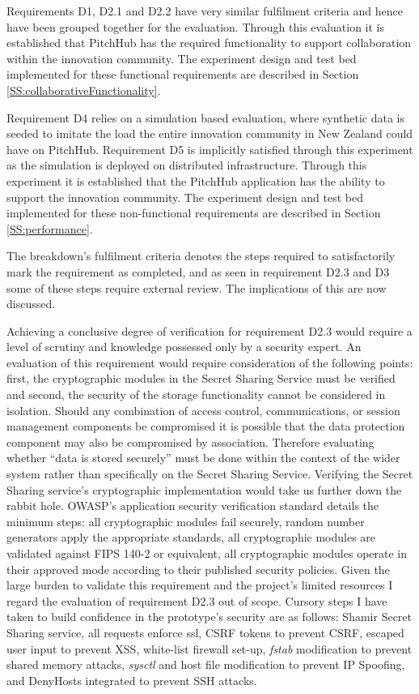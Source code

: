 Requirements D1, D2.1 and D2.2 have very similar fulfilment criteria and hence have been grouped together for the evaluation. Through this evaluation it is established that PitchHub has the required functionality to support collaboration within the innovation community. The experiment design and test bed implemented for these functional requirements are described in Section \ref{SS:collaborativeFunctionality}.

Requirement D4 relies on a simulation based evaluation, where synthetic data is seeded to imitate the load the entire innovation community in New Zealand could have on PitchHub. Requirement D5 is implicitly satisfied through this experiment as the simulation is deployed on distributed infrastructure. Through this experiment it is established that the PitchHub application has the ability to support the innovation community. The experiment design and test bed implemented for these non-functional requirements are described in Section \ref{SS:performance}.

The breakdown's fulfilment criteria denotes the steps required to satisfactorily mark the requirement as completed, and as seen in requirement D2.3 and D3 some of these steps require external review. The implications of this are now discussed.

Achieving a conclusive degree of verification for requirement D2.3 would require a level of scrutiny and knowledge possessed only by a security expert. An evaluation of this requirement would require consideration of the following points: first, the cryptographic modules in the Secret Sharing Service must be verified and second, the security of the storage functionality cannot be considered in isolation. Should any combination of access control, communications, or session management components be compromised it is possible that the data protection component may also be compromised by association. Therefore evaluating whether ``data is stored securely'' must be done within the context of the wider system rather than specifically on the Secret Sharing Service. Verifying the Secret Sharing service's cryptographic implementation would take us further down the rabbit hole. OWASP's application security verification standard \cite{OWASP:online} details the minimum steps: all cryptographic modules fail securely, random number generators apply the appropriate standards, all cryptographic modules are validated against FIPS 140-2 or equivalent, all cryptographic modules operate in their approved mode according to their published security policies. Given the large burden to validate this requirement and the project's limited resources I regard the evaluation of requirement D2.3 out of scope. Cursory steps I have taken to build confidence in the prototype's security are as follows: Shamir Secret Sharing service, all requests enforce ssl, CSRF tokens to prevent CSRF, escaped user input to prevent XSS, 
white-list firewall set-up, \textit{fstab} modification to prevent shared memory attacks, \textit{sysctl} and host file modification to prevent IP Spoofing, and DenyHosts \cite{DenyH6:online} integrated to prevent SSH attacks.

